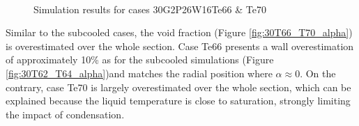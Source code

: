 \begin{figure}[!h]
\centering
{}
\\
\caption{Simulation results for cases 30G2P26W16Te66 \& Te70}
\label{fig:deb_cfd_30T66_T70}
\end{figure}

Similar to the subcooled cases, the void fraction (Figure \ref{fig:30T66_T70_alpha}) is overestimated over the whole section. Case Te66 presents a wall overestimation of approximately 10\% as for the subcooled simulations (Figure \ref{fig:30T62_T64_alpha})and matches the radial position where $\alpha \approx 0$. On the contrary, case Te70 is largely overestimated over the whole section, which can be explained because the liquid temperature is close to saturation, strongly limiting the impact of condensation.

\npar

